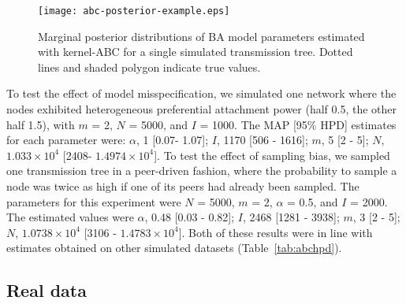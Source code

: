 \documentclass[nogrid]{MBE}
\begin{document}
\begin{figure*}[ht]
    \centering
  \texttt{[image: abc-posterior-example.eps]}
  \vspace{6pt}
  \caption{
    Marginal posterior distributions of BA model parameters estimated
    with kernel-ABC for a single simulated transmission tree. Dotted
    lines and shaded polygon indicate true values.
  }
  \label{fig:abcex}
\end{figure*}



To test the effect of model misspecification, we simulated one network where
the nodes exhibited heterogeneous preferential attachment power (half 0.5, the
other half 1.5), with $m$ = 2, $N$ = 5000, and $I$ = 1000. The MAP [95\%
HPD] estimates for each parameter were: 
$\alpha$, 
  1 
  [0.07-
   1.07];
$I$,
  1170 
  [506 -
   1616];
$m$,
  5 
  [2 -
   5];
$N$,
  \ensuremath{1.033\times 10^{4}} 
  [2408-
   \ensuremath{1.4974\times 10^{4}}].
To test the effect of sampling bias, we sampled one transmission tree in a
peer-driven fashion, where the probability to sample a node was twice as high
if one of its peers had already been sampled. The parameters for this
experiment were $N$ = 5000, $m$ = 2, $\alpha$ = 0.5, and $I$ = 2000. The
estimated values were
$\alpha$, 
  0.48 
  [0.03 -
   0.82];
$I$,
  2468 
  [1281 -
   3938];
$m$,
  3 
  [2 -
   5];
$N$,
  \ensuremath{1.0738\times 10^{4}} 
  [3106 -
   \ensuremath{1.4783\times 10^{4}}].
Both of these results were in line with estimates obtained on other simulated
datasets (Table~\ref{tab:abchpd}).

\subsection{Real data}
\end{document}
